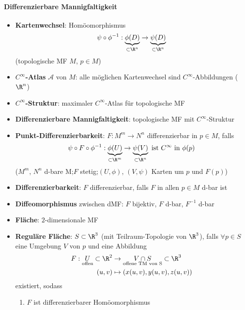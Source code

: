 \paragraph{Differenzierbare Mannigfaltigkeit}
\begin{itemize}
  \item \textbf{Kartenwechsel}: Homöomorphismus
  \begin{equation*}
    \psi \circ \phi^{-1} : \underbrace{\phi(D)}_{\subset \R^n} \to \underbrace{\psi(D)}_{\subset \R^n}
  \end{equation*}
  (topologische MF \( M \), \( p \in M \))
  \item \textbf{\( C^\infty \)-Atlas} \( \mathcal{A} \) von \( M \): alle möglichen Kartenwechsel sind \( C^\infty \)-Abbildungen (\( \R^n \))
  \item \textbf{\( C^\infty \)-Struktur}: maximaler \( C^\infty \)-Atlas für topologische MF
  \item \textbf{Differenzierbare Mannigfaltigkeit}: topologische MF mit \( C^\infty \)-Struktur
  \item \textbf{Punkt-Differenzierbarkeit}: \( F : M^m \to N^n \) differenzierbar in \( p \in M \), falls
  \begin{equation*}
    \psi \circ F \circ \phi^{-1} : \underbrace{\phi(U)}_{\subset \R^m} \to \underbrace{\psi(V)}_{\subset \R^n} \text{ ist \( C^\infty \) in \( \phi(p) \)}
  \end{equation*}
  (\( M^m \), \( N^n \) d-bare M;\@ \( F \) stetig;\@ \( (U,\phi) \), \( (V,\psi) \) Karten um \( p \) und \( F(p) \))
  \item \textbf{Differenzierbarkeit}: \( F \) differenzierbar, falls \( F \) in allen \( p \in M \) d-bar ist
  \item \textbf{Diffeomorphismus} zwischen dMF: \( F \) bijektiv, \( F \) d-bar, \( F^{-1} \) d-bar 
  \item \textbf{Fläche}: \( 2 \)-dimensionale MF
  \item \textbf{Reguläre Fläche}: \( S \subset \R^3 \) (mit Teilraum-Topologie von \( \R^3 \)), falls \( \forall p \in S \) eine Umgebung \( V \) von \( p \) und eine Abbildung
  \begin{align*}
    F : \underset{\text{offen}}{U} \subset \R^2 &\to \underset{\text{offene TM von S}}{V \cap S} \subset \R^3 \\
    (u,v) &\mapsto (x(u,v),y(u,v),z(u,v))
  \end{align*}
  existiert, sodass
  \begin{enumerate}
    \item \( F \) ist differenzierbarer Homöomorphismus

\end{enumerate}
\end{itemize}
